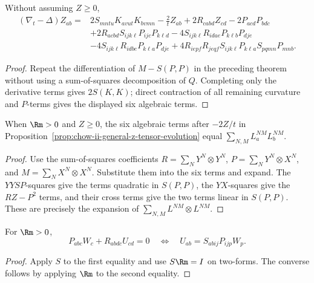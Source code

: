 \begin{proposition}
\label{prop:chow-ii-general-z-tensor-evolution}
Without assuming \(Z\ge0\),
\[
\begin{aligned}
(\nabla_t-\Delta)Z_{ab}={}&2S_{mntu}K_{avut}K_{bvmn}-\frac2tZ_{ab}
+2R_{cabd}Z_{cd}-2P_{acd}P_{bdc}\\
&+2R_{acbd}S_{ijk\ell}P_{ijc}P_{k\ell d}
-4S_{ijk\ell}R_{idae}P_{k\ell b}P_{dje}\\
&-4S_{ijk\ell}R_{idbe}P_{k\ell a}P_{dje}
+4R_{iepf}R_{jeqf}S_{ijk\ell}P_{k\ell a}S_{pqmn}P_{mnb}.
\end{aligned}
\]
\end{proposition}
\begin{proof}
\sketch Repeat the differentiation of \(M-S(P,P)\) in the preceding theorem without
using a sum-of-squares decomposition of \(Q\).  Completing only the derivative
terms gives \(2S(K,K)\); direct contraction of all remaining curvature and
\(P\)-terms gives the displayed six algebraic terms.
\end{proof}

\begin{lemma}
\label{lem:chow-ii-z-reaction-sum-of-squares}
When \(\Rm>0\) and \(Z\ge0\), the six algebraic terms after \(-2Z/t\) in
Proposition~\ref{prop:chow-ii-general-z-tensor-evolution} equal
\(\sum_{N,M}L_a^{NM}L_b^{NM}\).
\end{lemma}
\begin{proof}
\sketch Use the sum-of-squares coefficients
\(R=\sum_NY^N\otimes Y^N\),
\(P=\sum_NY^N\otimes X^N\), and
\(M=\sum_NX^N\otimes X^N\).  Substitute them into the six terms and expand.
The \(YYSP\)-squares give the terms quadratic in \(S(P,P)\), the \(YX\)-squares
give the \(RZ-P^2\) terms, and their cross terms give the two terms linear in
\(S(P,P)\).  These are precisely the expansion of
\(\sum_{N,M}L^{NM}\otimes L^{NM}\).
\end{proof}

\begin{lemma}
\label{lem:chow-ii-characterization-minimizing-two-form}
For \(\Rm>0\),
\[
P_{abc}W_c+R_{abdc}U_{cd}=0
\quad\Longleftrightarrow\quad
U_{ab}=S_{abij}P_{ijp}W_p.
\]
\end{lemma}
\begin{proof}
\sketch Apply \(S\) to the first equality and use \(S\Rm=I\) on two-forms.  The
converse follows by applying \(\Rm\) to the second equality.
\end{proof}

